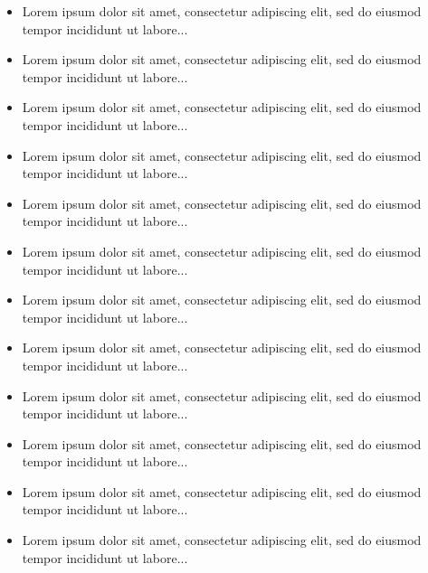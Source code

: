 \documentclass[10pt,a4paper,ragged2e,landscape]{altacv}
\begin{document}

\marginpar{}
\makecvheader



\begin{itemize}
\item Lorem ipsum dolor sit amet, consectetur adipiscing elit, sed do eiusmod tempor incididunt ut labore...
\item Lorem ipsum dolor sit amet, consectetur adipiscing elit, sed do eiusmod tempor incididunt ut labore...
\item Lorem ipsum dolor sit amet, consectetur adipiscing elit, sed do eiusmod tempor incididunt ut labore...
\item Lorem ipsum dolor sit amet, consectetur adipiscing elit, sed do eiusmod tempor incididunt ut labore...
\end{itemize}
\divider

\begin{itemize}
	\item Lorem ipsum dolor sit amet, consectetur adipiscing elit, sed do eiusmod tempor incididunt ut labore...
	\item Lorem ipsum dolor sit amet, consectetur adipiscing elit, sed do eiusmod tempor incididunt ut labore...
  \item Lorem ipsum dolor sit amet, consectetur adipiscing elit, sed do eiusmod tempor incididunt ut labore...
  \item Lorem ipsum dolor sit amet, consectetur adipiscing elit, sed do eiusmod tempor incididunt ut labore...
\end{itemize}
\divider

\begin{itemize}
\item Lorem ipsum dolor sit amet, consectetur adipiscing elit, sed do eiusmod tempor incididunt ut labore...
\item Lorem ipsum dolor sit amet, consectetur adipiscing elit, sed do eiusmod tempor incididunt ut labore...
\item Lorem ipsum dolor sit amet, consectetur adipiscing elit, sed do eiusmod tempor incididunt ut labore...
\item Lorem ipsum dolor sit amet, consectetur adipiscing elit, sed do eiusmod tempor incididunt ut labore...
\end{itemize}
\end{document}
